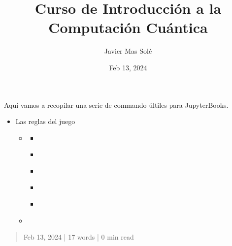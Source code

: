 \documentclass[letterpaper,10pt,english]{jupyterBook}
\title{Curso de Introducción a la Computación Cuántica}
\date{Feb 13, 2024}
\author{Javier Mas Solé}
\begin{document}
\pagestyle{empty}
\sphinxmaketitle
\pagestyle{plain}
\sphinxtableofcontents
\pagestyle{normal}
\label{\detokenize{docs/index::doc}}


\sphinxAtStartPar
Aquí vamos a recopilar una serie de commando últiles para JupyterBooks.
\begin{itemize}
\item {} 
\sphinxAtStartPar
Las reglas del juego

\begin{itemize}
\item {} 
\sphinxAtStartPar
{\hyperref[\detokenize{docs/Part_01_Formalismo/Chapter_01_01_formalismo_matematico_myst::doc}]{}}
\begin{itemize}
\item {} 
\sphinxAtStartPar
{\hyperref[\detokenize{docs/Part_01_Formalismo/Chapter_01_02_Formalismo_matem_xe1tico/01_01_Numeros_Complejos_myst::doc}]{}}

\item {} 
\sphinxAtStartPar
{\hyperref[\detokenize{docs/Part_01_Formalismo/Chapter_01_02_Formalismo_matem_xe1tico/01_02_Vectores_myst::doc}]{}}

\item {} 
\sphinxAtStartPar
{\hyperref[\detokenize{docs/Part_01_Formalismo/Chapter_01_02_Formalismo_matem_xe1tico/01_03_Operadores_myst::doc}]{}}

\item {} 
\sphinxAtStartPar
{\hyperref[\detokenize{docs/Part_01_Formalismo/Chapter_01_02_Formalismo_matem_xe1tico/01_04_Tensores_myst::doc}]{}}

\item {} 
\sphinxAtStartPar
{\hyperref[\detokenize{docs/Part_01_Formalismo/Chapter_01_02_Formalismo_matem_xe1tico/01_05_Probabilidades_myst::doc}]{}}

\end{itemize}

\item {} 
\sphinxAtStartPar
{\hyperref[\detokenize{docs/Part_01_Formalismo/Chapter_02_01_Fundamentos_MC_myst::doc}]{}}

\end{itemize}
\end{itemize}

\sphinxstepscope
\begin{quote}

\sphinxAtStartPar
Feb 13, 2024 | 17 words | 0 min read
\end{quote}
\end{document}
